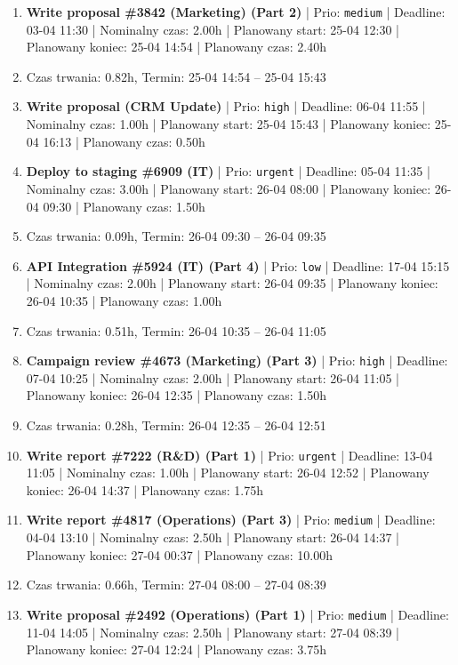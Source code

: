 {\begin{enumerate}
  \item [\textbf{14673}] \textbf{Write proposal \#3842 (Marketing) (Part 2)} | Prio: \texttt{medium} | Deadline: 03-04 11:30 | Nominalny czas: 2.00h | Planowany start: 25-04 12:30 | Planowany koniec: 25-04 14:54 | Planowany czas: 2.40h
  \item [\textbf{PRZERWA}] Czas trwania: 0.82h, Termin: 25-04 14:54 -- 25-04 15:43
  \item [\textbf{14629}] \textbf{Write proposal (CRM Update)} | Prio: \texttt{high} | Deadline: 06-04 11:55 | Nominalny czas: 1.00h | Planowany start: 25-04 15:43 | Planowany koniec: 25-04 16:13 | Planowany czas: 0.50h
  \item [\textbf{14597}] \textbf{Deploy to staging \#6909 (IT)} | Prio: \texttt{urgent} | Deadline: 05-04 11:35 | Nominalny czas: 3.00h | Planowany start: 26-04 08:00 | Planowany koniec: 26-04 09:30 | Planowany czas: 1.50h
  \item [\textbf{PRZERWA}] Czas trwania: 0.09h, Termin: 26-04 09:30 -- 26-04 09:35
  \item [\textbf{14696}] \textbf{API Integration \#5924 (IT) (Part 4)} | Prio: \texttt{low} | Deadline: 17-04 15:15 | Nominalny czas: 2.00h | Planowany start: 26-04 09:35 | Planowany koniec: 26-04 10:35 | Planowany czas: 1.00h
  \item [\textbf{PRZERWA}] Czas trwania: 0.51h, Termin: 26-04 10:35 -- 26-04 11:05
  \item [\textbf{14625}] \textbf{Campaign review \#4673 (Marketing) (Part 3)} | Prio: \texttt{high} | Deadline: 07-04 10:25 | Nominalny czas: 2.00h | Planowany start: 26-04 11:05 | Planowany koniec: 26-04 12:35 | Planowany czas: 1.50h
  \item [\textbf{PRZERWA}] Czas trwania: 0.28h, Termin: 26-04 12:35 -- 26-04 12:51
  \item [\textbf{14601}] \textbf{Write report \#7222 (R\&D) (Part 1)} | Prio: \texttt{urgent} | Deadline: 13-04 11:05 | Nominalny czas: 1.00h | Planowany start: 26-04 12:52 | Planowany koniec: 26-04 14:37 | Planowany czas: 1.75h
  \item [\textbf{14639}] \textbf{Write report \#4817 (Operations) (Part 3)} | Prio: \texttt{medium} | Deadline: 04-04 13:10 | Nominalny czas: 2.50h | Planowany start: 26-04 14:37 | Planowany koniec: 27-04 00:37 | Planowany czas: 10.00h
  \item [\textbf{PRZERWA}] Czas trwania: 0.66h, Termin: 27-04 08:00 -- 27-04 08:39
  \item [\textbf{14668}] \textbf{Write proposal \#2492 (Operations) (Part 1)} | Prio: \texttt{medium} | Deadline: 11-04 14:05 | Nominalny czas: 2.50h | Planowany start: 27-04 08:39 | Planowany koniec: 27-04 12:24 | Planowany czas: 3.75h

\end{enumerate}}
